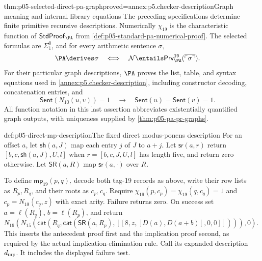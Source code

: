 \begin{hbtheorem}{thm:p05-selected-direct-pa-graph}{proved=annex:p5.checker-description}{Graph meaning and internal library equations}
The preceding specifications determine finite primitive recursive descriptions.
Numerically \(\chi_{19}\) is the characteristic function of
\(\mathsf{StdProof}_{\PA}\) from
\cref{def:p05-standard-pa-numerical-proof}.  The selected formulas are
\(\Sigma^0_1\), and for every arithmetic sentence \(\sigma\),
\[
 \PA\derives\sigma
 \quad\Longleftrightarrow\quad
 \mathcal N\entails
       \mathsf{Prv}^{19}_{\PA}(\overline{\ulcorner\sigma\urcorner}).
\]
For their particular graph descriptions, \(\PA\) proves the list,
table, and syntax equations used in
\cref{annex:p5.checker-description}, including constructor decoding,
concatenation entries, and
\[
 \mathsf{Sent}(N_{10}(u,v))=1
       \quad\longrightarrow\quad
            \mathsf{Sent}(u)=\mathsf{Sent}(v)=1.
\]
All function notation in this last assertion abbreviates existentially
quantified graph outputs, with uniqueness supplied by
\cref{thm:p05-pa-pr-graphs}.
\end{hbtheorem}

\begin{hbdefinition}{def:p05-direct-mp-description}{The fixed direct modus-ponens description}
For an offset \(a\), let \(\mathsf{sh}(a,J)\) map each entry \(j\)
of \(J\) to \(a+j\).  Let \(\mathsf{sr}(a,r)\) return
\([b,c,\mathsf{sh}(a,J),U,l]\) when \(r=[b,c,J,U,l]\) has length
five, and return zero otherwise.  Let \(\mathsf{SR}(a,R)\) map
\(\mathsf{sr}(a,\cdot)\) over \(R\).

To define \(\mathsf{mp}_{19}(p,q)\), decode both tag-19 records as above,
write their row lists as \(R_p,R_q\), and their roots as \(c_p,c_q\).
Require \(\chi_{19}(p,c_p)=\chi_{19}(q,c_q)=1\) and
\(c_p=N_{10}(c_q,z)\) with exact arity.  Failure returns zero.
On success set \(a=\ell(R_q)\), \(b=\ell(R_p)\), and return
\[
 N_{19}\!\left(N_{15}\!\left(
   \mathsf{cat}\!\left(R_q,
     \mathsf{cat}(\mathsf{SR}(a,R_p),
          [[8,z,[D(a),D(a+b)],0,0]])\right)\right),0\right).
\]
This inserts the antecedent proof first and the implication proof second,
as required by the actual implication-elimination rule.  Call its expanded
description \(d_{\rm mp}\).  It includes the displayed failure test.
\end{hbdefinition}

